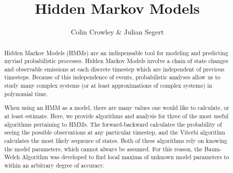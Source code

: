 \documentclass[11pt]{article}
\title{Hidden Markov Models}
\author{Colin Crowley \& Julian Segert}
\date{}
\begin{document}
\maketitle

\begin{abstract}
Hidden Markov Models (HMMs) are an indispensable tool for modeling and
predicting myriad probabilistic processes. Hidden Markov Models involve
a chain of state changes and observable emissions at each discrete
timestep which are independent of previous timesteps. Because of this
independence of events, probabilistic analyses allow us to study many
complex systems (or at least approximations of complex systems) in
polynomial time.

When using an HMM as a model, there are many values one would like to
calculate, or at least estimate. Here, we provide algorithms and
analysis for three of the most useful algorithms pertaining to HMMs. The
forward-backward calculates the probability of seeing the possible
observations at any particular timestep, and the Viterbi algorithm
calculates the most likely sequence of states. Both of these algorithms
rely on knowing the model parameters, which cannot always be assumed.
For this reason, the Baum-Welch Algorithm was developed to find local
maxima of unknown model parameters to within an arbitrary degree of accuracy.
\end{abstract}




%
%
%




\appendix
%
%
\end{document}
